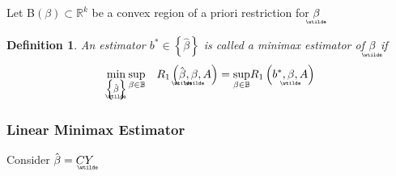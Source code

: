 \documentclass{article}
\newtheorem{definition}[theorem]{Definition}
\begin{document}
Let B$\left( \beta \right) \subset \mathbb{R}^{k}$ be a convex region of a
priori restriction for $\underaccent{\wtilde}{\beta}$\bigskip

\begin{definition}
An estimator $b^{\ast }\in \left\{ \hat{\beta}\right\} $ is called a \textsf{%
minimax estimator} of $%
\underaccent{\wtilde}{\beta}%
$ if%
\begin{equation}
\underset{\left\{ 
\underaccent{\wtilde}{\hat{\beta}}%
\right\} }{\min }\,\underset{\beta \in \mathbb{B}}{\sup }\quad R_{1}\left( %
\underaccent{\wtilde}{\hat{\beta}},\underaccent{\wtilde}{\beta},A\right) =%
\underset{\beta \in \mathbb{B}}{\sup }R_{1}\left( b^{\ast },%
\underaccent{\wtilde}{\beta},A\right)
\end{equation}
\end{definition}

\bigskip

\subsubsection{Linear Minimax Estimator}

Consider $\hat{\beta}=C%
\underaccent{\wtilde}{Y}%
$
\end{document}
